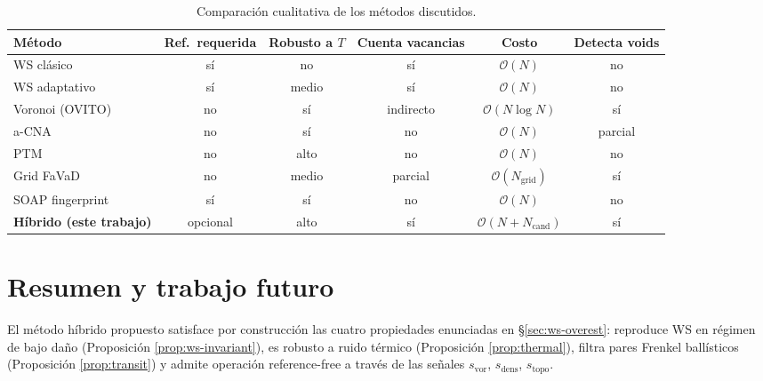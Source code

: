 \documentclass[11pt,a4paper]{article}
\theoremstyle{remark}
\begin{document}
\begin{table}[H]
\centering
\caption{Comparación cualitativa de los métodos discutidos.}
\label{tab:methods}
\small
\begin{tabular}{lccccc}
\toprule
Método & Ref.\ requerida & Robusto a $T$ & Cuenta vacancias & Costo & Detecta voids \\
\midrule
WS clásico                  & sí & no  & sí & $\mathcal{O}(N)$    & no       \\
WS adaptativo               & sí & medio & sí & $\mathcal{O}(N)$  & no       \\
Voronoi (OVITO)             & no & sí  & indirecto & $\mathcal{O}(N\log N)$ & sí \\
a-CNA \cite{Stukowski2012}  & no & sí  & no  & $\mathcal{O}(N)$  & parcial  \\
PTM \cite{Larsen2016}       & no & alto & no & $\mathcal{O}(N)$  & no       \\
Grid FaVaD \cite{Toussaint2020} & no & medio & parcial & $\mathcal{O}(N_\text{grid})$ & sí \\
SOAP fingerprint \cite{Toussaint2020} & sí & sí & no & $\mathcal{O}(N)$ & no \\
\textbf{Híbrido (este trabajo)} & opcional & alto & sí & $\mathcal{O}(N + N_\text{cand})$ & sí \\
\bottomrule
\end{tabular}
\end{table}

\section{Resumen y trabajo futuro}

El método híbrido propuesto satisface por construcción las cuatro
propiedades enunciadas en \S\ref{sec:ws-overest}: reproduce WS en
régimen de bajo daño (Proposición \ref{prop:ws-invariant}), es
robusto a ruido térmico (Proposición \ref{prop:thermal}), filtra
pares Frenkel ballísticos (Proposición \ref{prop:transit}) y admite
operación reference-free a través de las señales $s_\text{vor}$,
$s_\text{dens}$, $s_\text{topo}$.
\end{document}

